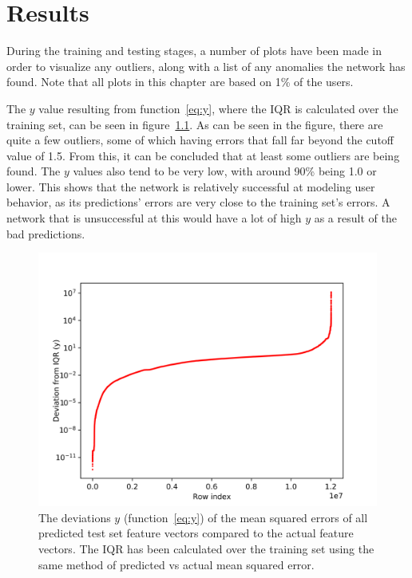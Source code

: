 \chapter{Results}\label{ch:results}

During the training and testing stages, a number of plots have been made in order to visualize any outliers, along with a list of any anomalies the network has found. Note that all plots in this chapter are based on 1\% of the users.

The \(y\) value resulting from function~\ref{eq:y}, where the IQR is calculated over the training set, can be seen in figure~\ref{fig:iqr_scale}. As can be seen in the figure, there are quite a few outliers, some of which having errors that fall far beyond the cutoff value of 1.5. From this, it can be concluded that at least some outliers are being found. The \(y\) values also tend to be very low, with around 90\% being 1.0 or lower. This shows that the network is relatively successful at modeling user behavior, as its predictions' errors are very close to the training set's errors. A network that is unsuccessful at this would have a lot of high \(y\) as a result of the bad predictions.

\begin{figure}
	\begin{center}
		\includegraphics[scale=1.6]{results/all_deviations}
	\end{center}
	\caption{The deviations \(y\) (function~\ref{eq:y}) of the mean squared errors of all predicted test set feature vectors compared to the actual feature vectors. The IQR has been calculated over the training set using the same method of predicted vs actual mean squared error.~\label{fig:iqr_scale}}
\end{figure}

